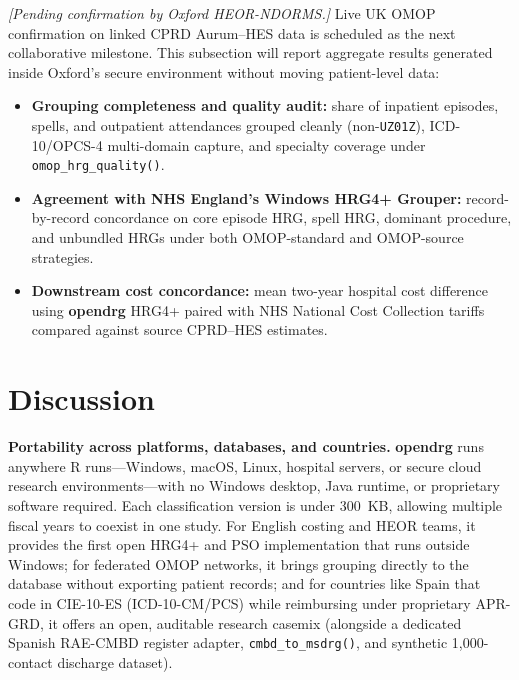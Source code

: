 \documentclass[fleqn,10pt]{IOMEDArticle}
\begin{document}
\emph{[Pending confirmation by Oxford HEOR-NDORMS.]} Live UK OMOP confirmation on linked CPRD Aurum--HES data is scheduled as the next collaborative milestone. This subsection will report aggregate results generated inside Oxford's secure environment without moving patient-level data:
\begin{itemize}[leftmargin=*,nosep]
    \item \textbf{Grouping completeness and quality audit:} share of inpatient episodes, spells, and outpatient attendances grouped cleanly (non-\texttt{UZ01Z}), ICD-10/OPCS-4 multi-domain capture, and specialty coverage under \texttt{omop\_hrg\_quality()}.
    \item \textbf{Agreement with NHS England's Windows HRG4+ Grouper:} record-by-record concordance on core episode HRG, spell HRG, dominant procedure, and unbundled HRGs under both OMOP-standard and OMOP-source strategies.
    \item \textbf{Downstream cost concordance:} mean two-year hospital cost difference using \textbf{opendrg} HRG4+ paired with NHS National Cost Collection tariffs compared against source CPRD--HES estimates.
\end{itemize}


\section{Discussion}

\textbf{Portability across platforms, databases, and countries.} \textbf{opendrg} runs anywhere R runs---Windows, macOS, Linux, hospital servers, or secure cloud research environments---with no Windows desktop, Java runtime, or proprietary software required. Each classification version is under 300~KB, allowing multiple fiscal years to coexist in one study. For English costing and HEOR teams, it provides the first open HRG4+ and PSO implementation that runs outside Windows; for federated OMOP networks, it brings grouping directly to the database without exporting patient records; and for countries like Spain that code in CIE-10-ES (ICD-10-CM/PCS) while reimbursing under proprietary APR-GRD, it offers an open, auditable research casemix (alongside a dedicated Spanish RAE-CMBD register adapter, \texttt{cmbd\_to\_msdrg()}, and synthetic 1{,}000-contact discharge dataset).
\end{document}
